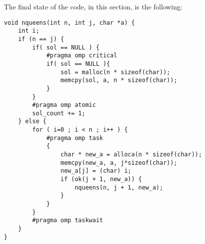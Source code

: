 \clearpage
\justify
The final state of the code, in this section, is the following:
\begin{lstlisting}
void nqueens(int n, int j, char *a) {
    int i;
    if (n == j) {
        if( sol == NULL ) {
            #pragma omp critical
            if( sol == NULL ){
                sol = malloc(n * sizeof(char));
                memcpy(sol, a, n * sizeof(char));
            }
        }
        #pragma omp atomic
        sol_count += 1;
    } else {
        for ( i=0 ; i < n ; i++ ) {
            #pragma omp task
            {
                char * new_a = alloca(n * sizeof(char));
                memcpy(new_a, a, j*sizeof(char));
                new_a[j] = (char) i;
                if (ok(j + 1, new_a)) {
                    nqueens(n, j + 1, new_a);
                }
            }
        }
        #pragma omp taskwait
    }
}
\end{lstlisting}
